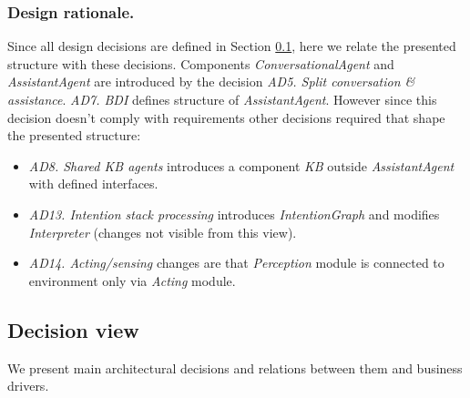 \documentclass{llncs}
\begin{document}
\subsubsection{Design rationale.} Since all design decisions are defined in Section \ref{sec:decisionview}, here we relate the presented structure with these decisions. Components \emph{ConversationalAgent} and  \emph{AssistantAgent} are introduced by the decision \emph{AD5. Split conversation \& assistance}. \emph{AD7. BDI} defines structure of  \emph{AssistantAgent}. However since this decision doesn't comply with requirements other decisions required that shape the presented structure:
\begin{itemize}
	\item \emph{AD8. Shared KB agents} introduces a component \emph{KB} outside \emph{AssistantAgent} with defined interfaces.
	\item \emph{AD13. Intention stack processing} introduces \emph{IntentionGraph} and modifies \emph{Interpreter} (changes not visible from this view).
	\item \emph{AD14. Acting/sensing} changes are that \emph{Perception} module is connected to environment only via \emph{Acting} module.
	
\end{itemize}





\subsection{Decision view}
\label{sec:decisionview}
We present main architectural decisions and relations between them and business drivers.
\end{document}
